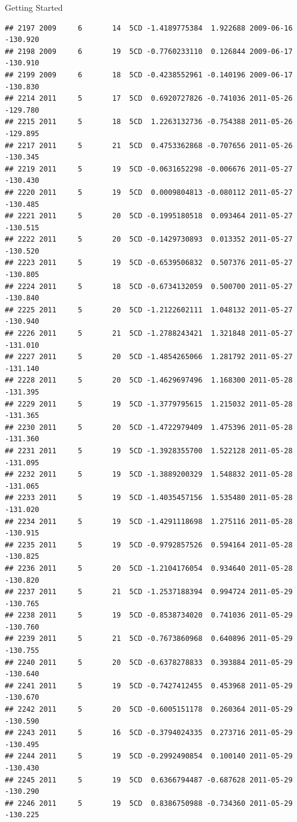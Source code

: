 \documentclass[
  ignorenonframetext,
]{beamer}
\begin{document}
\begin{frame}[fragile]{Getting Started}
\begin{verbatim}
## 2197 2009     6       14  5CD -1.4189775384  1.922688 2009-06-16 -130.920
## 2198 2009     6       19  5CD -0.7760233110  0.126844 2009-06-17 -130.910
## 2199 2009     6       18  5CD -0.4238552961 -0.140196 2009-06-17 -130.830
## 2214 2011     5       17  5CD  0.6920727826 -0.741036 2011-05-26 -129.780
## 2215 2011     5       18  5CD  1.2263132736 -0.754388 2011-05-26 -129.895
## 2217 2011     5       21  5CD  0.4753362868 -0.707656 2011-05-26 -130.345
## 2219 2011     5       19  5CD -0.0631652298 -0.006676 2011-05-27 -130.430
## 2220 2011     5       19  5CD  0.0009804813 -0.080112 2011-05-27 -130.485
## 2221 2011     5       20  5CD -0.1995180518  0.093464 2011-05-27 -130.515
## 2222 2011     5       20  5CD -0.1429730893  0.013352 2011-05-27 -130.520
## 2223 2011     5       19  5CD -0.6539506832  0.507376 2011-05-27 -130.805
## 2224 2011     5       18  5CD -0.6734132059  0.500700 2011-05-27 -130.840
## 2225 2011     5       20  5CD -1.2122602111  1.048132 2011-05-27 -130.940
## 2226 2011     5       21  5CD -1.2788243421  1.321848 2011-05-27 -131.010
## 2227 2011     5       20  5CD -1.4854265066  1.281792 2011-05-27 -131.140
## 2228 2011     5       20  5CD -1.4629697496  1.168300 2011-05-28 -131.395
## 2229 2011     5       19  5CD -1.3779795615  1.215032 2011-05-28 -131.365
## 2230 2011     5       20  5CD -1.4722979409  1.475396 2011-05-28 -131.360
## 2231 2011     5       19  5CD -1.3928355700  1.522128 2011-05-28 -131.095
## 2232 2011     5       19  5CD -1.3889200329  1.548832 2011-05-28 -131.065
## 2233 2011     5       19  5CD -1.4035457156  1.535480 2011-05-28 -131.020
## 2234 2011     5       19  5CD -1.4291118698  1.275116 2011-05-28 -130.915
## 2235 2011     5       19  5CD -0.9792857526  0.594164 2011-05-28 -130.825
## 2236 2011     5       20  5CD -1.2104176054  0.934640 2011-05-28 -130.820
## 2237 2011     5       21  5CD -1.2537188394  0.994724 2011-05-29 -130.765
## 2238 2011     5       19  5CD -0.8538734020  0.741036 2011-05-29 -130.760
## 2239 2011     5       21  5CD -0.7673860968  0.640896 2011-05-29 -130.755
## 2240 2011     5       20  5CD -0.6378278833  0.393884 2011-05-29 -130.640
## 2241 2011     5       19  5CD -0.7427412455  0.453968 2011-05-29 -130.670
## 2242 2011     5       20  5CD -0.6005151178  0.260364 2011-05-29 -130.590
## 2243 2011     5       16  5CD -0.3794024335  0.273716 2011-05-29 -130.495
## 2244 2011     5       19  5CD -0.2992490854  0.100140 2011-05-29 -130.430
## 2245 2011     5       19  5CD  0.6366794487 -0.687628 2011-05-29 -130.290
## 2246 2011     5       19  5CD  0.8386750988 -0.734360 2011-05-29 -130.225

\end{verbatim}
\end{frame}
\end{document}
